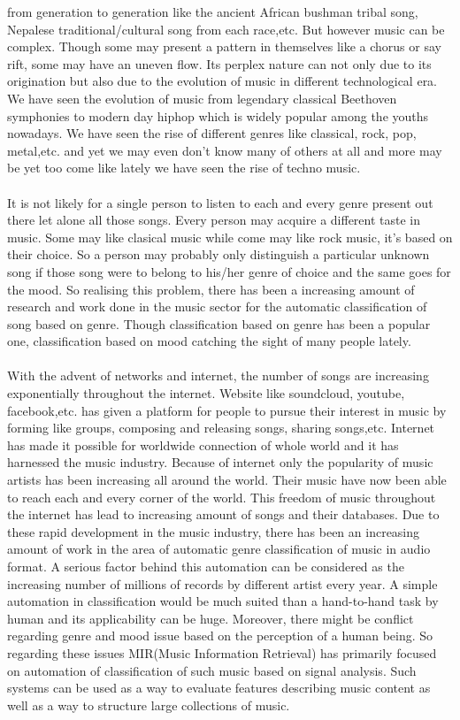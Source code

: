 from generation to generation like the ancient African bushman tribal song, Nepalese traditional/cultural song from each race,etc. But however music can
be complex. Though some may present a pattern in themselves like a chorus or say rift, some may have an uneven flow. Its perplex nature can not only due to 
its origination but also due to the evolution of music in different technological era. We have seen the evolution of music from legendary classical 
Beethoven symphonies to modern day hiphop which is widely popular among the youths nowadays. We have seen the rise of different genres like classical, rock,
pop, metal,etc. and yet we may even don't know many of others at all and more may be yet too come like lately we have seen the rise of techno music.\\ 
\\
It is not likely for a single person to listen to each and every genre present out there let alone all those songs. Every person may acquire a different taste 
in music. Some may like clasical music while come may like rock music, it's based on their choice. So a person may probably only distinguish a particular unknown song 
if those song were to belong to his/her genre of choice and the same goes for the mood. So realising this problem, there has been a increasing amount of research
and work done in the music sector for the automatic classification of song based on genre. Though classification based on genre has been a popular one,
classification based on mood catching the sight of many people lately.\\
\\
With the advent of networks and internet, the number of songs are increasing exponentially throughout the internet. Website like soundcloud, youtube, facebook,etc. 
has given a platform for people to pursue their interest in music by forming like groups, composing and releasing songs, sharing songs,etc.
Internet has made it possible for worldwide connection of whole world and it has harnessed the music industry. Because of internet only the
popularity of music artists has been increasing all around the world. Their music have now been able to reach each and every corner of the world.
This freedom of music throughout the internet has lead to increasing amount of songs and their databases.
Due to these rapid development in the music industry, there has been an increasing amount of work in the area of automatic genre classification
of music in audio format. A serious factor behind this automation can be considered as the increasing number of millions of records by different 
artist every year. A simple automation in classification would be much suited than a hand-to-hand task by human and its applicability can be huge.
Moreover, there might be conflict regarding genre and mood issue based on the perception of a human being. So regarding these
issues MIR(Music Information Retrieval) has primarily focused on automation of classification of such music based on signal analysis. Such systems
can be used as a way to evaluate features describing music content as well as a way to structure large collections of music.\\


